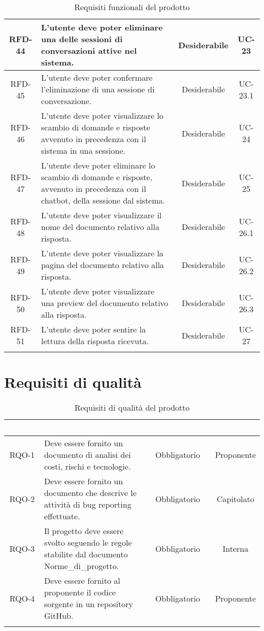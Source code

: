 \begin{xltabular}{\textwidth}{| c | X | c | c |}
    \hline
    RFD-44 & L’utente deve poter eliminare una delle sessioni di conversazioni attive nel sistema. & Desiderabile & UC-23 \\
    \hline
    RFD-45 & L’utente deve poter confermare l’eliminazione di una sessione di conversazione. & Desiderabile & UC-23.1 \\
    \hline
    RFD-46 & L’utente deve poter visualizzare lo scambio di domande e risposte avvenuto in precedenza con il sistema in una sessione. & Desiderabile & UC-24 \\
    \hline
    RFD-47 & L’utente deve poter eliminare lo scambio di domande e risposte, avvenuto in precedenza con il chatbot, della sessione dal sistema. & Desiderabile & UC-25 \\
    \hline
    RFD-48 & L’utente deve poter visualizzare il nome del documento relativo alla risposta. & Desiderabile & UC-26.1 \\
    \hline
    RFD-49 & L'utente deve poter visualizzare la pagina del documento relativo alla risposta. & Desiderabile & UC-26.2 \\
    \hline
    RFD-50 & L’utente deve poter visualizzare una preview del documento relativo alla risposta. & Desiderabile & UC-26.3 \\
    \hline
    RFD-51 & L’utente deve poter sentire la lettura della risposta ricevuta. & Desiderabile & UC-27 \\
    \hline
     \caption{Requisiti funzionali del prodotto}
    \label{tab:reqfun}
\end{xltabular}
\endgroup

\section{Requisiti di qualità}

\begingroup
\setlength{\tabcolsep}{10pt}
\renewcommand{\arraystretch}{1.5}
\begin{xltabular}{\textwidth}{| c | X | c | c |}
    \hline
     \textbf{\textcolor{white}{Codice}} & \textbf{\textcolor{white}{Descrizione}} & \textbf{\textcolor{white}{Classificazione}} & \textbf{\textcolor{white}{Fonte}}\\
    \hline
    \endhead
    RQO-1 & Deve essere fornito un documento di analisi dei costi, rischi e tecnologie. & Obbligatorio & Proponente \\
    \hline
    RQO-2 & Deve essere fornito un documento che descrive le attività di bug reporting effettuate. & Obbligatorio & Capitolato \\
    \hline
    RQO-3 & Il progetto deve essere svolto seguendo le regole stabilite dal documento Norme\_di\_progetto. & Obbligatorio & Interna \\
    \hline
    RQO-4 & Deve essere fornito al proponente il codice sorgente in un repository GitHub. & Obbligatorio & Proponente \\
    \hline
     \caption{Requisiti di qualità del prodotto}
    \label{tab:reqqua}
\end{xltabular}
\endgroup

